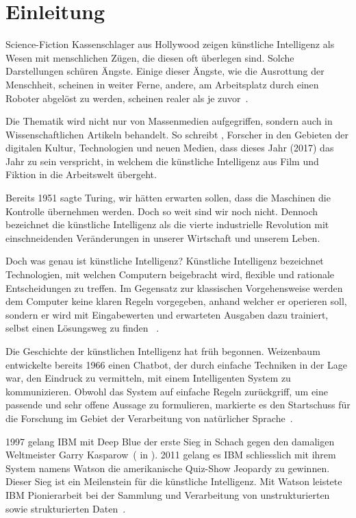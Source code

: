 \cleardoublepage
\section{Einleitung}

Science-Fiction Kassenschlager aus Hollywood zeigen künstliche Intelligenz als Wesen mit menschlichen Zügen, die diesen oft überlegen sind. Solche Darstellungen schüren Ängste. Einige dieser Ängste, wie die Ausrottung der Menschheit, scheinen in weiter Ferne, andere, am Arbeitsplatz durch einen Roboter abgelöst zu werden, scheinen realer als je zuvor~\autocite{Lu2018}.

Die Thematik wird nicht nur von Massenmedien aufgegriffen, sondern auch in Wissenschaftlichen Artikeln behandelt. So schreibt \textcite{Tredinnick2017}, Forscher in den Gebieten der digitalen Kultur, Technologien und neuen Medien, dass dieses Jahr (2017) das Jahr zu sein verspricht, in welchem die künstliche Intelligenz aus Film und Fiktion in die Arbeitswelt übergeht. 

Bereits 1951 sagte Turing, wir hätten erwarten sollen, dass die Maschinen die Kontrolle übernehmen werden. Doch so weit sind wir noch nicht. Dennoch bezeichnet \textcite{Tredinnick2017} die künstliche Intelligenz als die vierte industrielle Revolution mit einschneidenden Veränderungen in unserer Wirtschaft und unserem Leben.

Doch was genau ist künstliche Intelligenz? Künstliche Intelligenz bezeichnet Technologien, mit welchen Computern beigebracht wird, flexible und rationale Entscheidungen zu treffen. Im Gegensatz zur klassischen Vorgehensweise werden dem Computer keine klaren Regeln vorgegeben, anhand welcher er operieren soll, sondern er wird mit Eingabewerten und erwarteten Ausgaben dazu trainiert, selbst einen Lösungsweg zu finden ~\autocite{Tredinnick2017}.

Die Geschichte der künstlichen Intelligenz hat früh begonnen. Weizenbaum entwickelte bereits 1966 einen Chatbot, der durch einfache Techniken in der Lage war, den Eindruck zu vermitteln, mit einem Intelligenten System zu kommunizieren. Obwohl das System auf einfache Regeln zurückgriff, um eine passende und sehr offene Aussage zu formulieren, markierte es den Startschuss für die Forschung im Gebiet der Verarbeitung von natürlicher Sprache~\autocite{Tredinnick2017}. 

1997 gelang IBM mit Deep Blue der erste Sieg in Schach gegen den damaligen Weltmeister Garry Kasparow~(\cite{Campbell} in \cite{Tredinnick2017}). 2011 gelang es IBM schliesslich mit ihrem System namens Watson die amerikanische Quiz-Show Jeopardy zu gewinnen. Dieser Sieg ist ein Meilenstein für die künstliche Intelligenz. Mit Watson leistete IBM Pionierarbeit bei der Sammlung und Verarbeitung von unstrukturierten sowie strukturierten Daten~\autocite{Tredinnick2017}.


